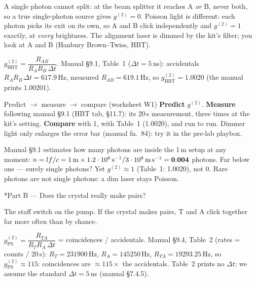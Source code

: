 \documentclass[a4paper,11pt]{article}
\makeatletter
\newcommand{\gtwo}[1]{g^{(2)}_{\mathrm{#1}}}
\renewcommand\section{\@startsection{section}{1}{\z@}{-1.6ex \@plus -.5ex}{0.6ex}{\normalfont\large\bfseries\color{ibmblue}}}
\makeatother
\begin{document}
A single photon cannot split: at the beam splitter it reaches A \emph{or} B, never both, so
a true single-photon source gives $g^{(2)} = 0$. Poisson light is different: each photon
picks its exit on its own, so A and B click independently and $g^{(2)} = 1$ exactly, at
\emph{every} brightness. The alignment laser is dimmed by the kit's filter; you look at A
and B (Hanbury Brown--Twiss, HBT).

\begin{numberbox}
$\gtwo{HBT} = \dfrac{R_{AB}}{R_A R_B\,\Delta t}$. Manual \S9.1, Table~1 ($\Delta t = 5$\,ns):
accidentals $R_A R_B\,\Delta t = 617.9$\,Hz, measured $R_{AB} = 619.1$\,Hz, so
$\gtwo{HBT} = 1.0020$ (the manual prints 1.00201).
\end{numberbox}

\begin{pmcbox}{Predict $\rightarrow$ measure $\rightarrow$ compare (worksheet W1)}
\textbf{Predict} $g^{(2)}$. \textbf{Measure} following manual \S9.1 (HBT tab, \S11.7):
its 20\,s measurement, three times at the kit's setting. \textbf{Compare} with 1, with
Table~1 (1.0020), and run to run. Dimmer light only enlarges the error bar (manual fn.~84):
try it in the pre-lab playbox.
\end{pmcbox}

\begin{shockbox}
Manual \S9.1 estimates how many photons are inside the 1\,m setup at any moment:
$n = l f / c = 1\,\text{m} \times 1.2\cdot10^{6}\,\text{s}^{-1} / 3\cdot10^{8}\,\text{m\,s}^{-1}
= \mathbf{0.004}$ photons. Far below one --- surely single photons? Yet
$g^{(2)} \approx 1$ (Table~1: 1.0020), not 0. Rare photons are not single photons: a dim
laser stays Poisson.
\end{shockbox}

\section*{Part B --- Does the crystal really make pairs?}

The staff switch on the pump. If the crystal makes pairs, T and A click together far more
often than by chance.

\begin{numberbox}
$\gtwo{PS} = \dfrac{R_{TA}}{R_T R_A\,\Delta t}$ = coincidences / accidentals. Manual
\S9.4, Table~2 (rates = counts / 20\,s): $R_T = 231900$\,Hz, $R_A = 145250$\,Hz,
$R_{TA} = 19293.25$\,Hz, so $\gtwo{PS} \approx 115$: coincidences are
$\approx 115\times$ the accidentals. Table~2 prints no $\Delta t$; we assume the standard
$\Delta t = 5$\,ns (manual \S7.4.5).
\end{numberbox}
\end{document}
